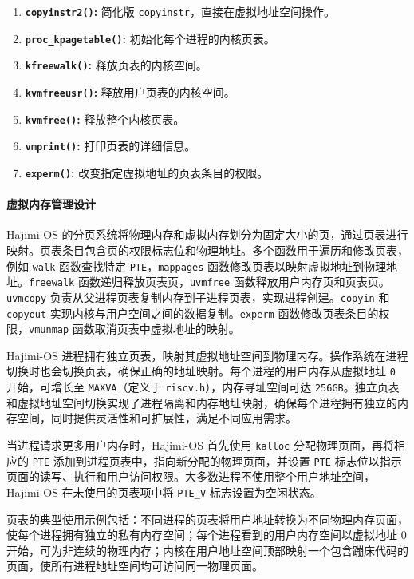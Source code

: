 \documentclass[UTF8]{article}
\begin{document}
\begin{enumerate}[label=\textbf{\arabic*}., wide, labelwidth=!, labelindent=0pt]
  \item \textbf{\texttt{copyinstr2()}:} 简化版 \texttt{copyinstr}，直接在虚拟地址空间操作。
  \item \textbf{\texttt{proc\_kpagetable()}:} 初始化每个进程的内核页表。
  \item \textbf{\texttt{kfreewalk()}:} 释放页表的内核空间。
  \item \textbf{\texttt{kvmfreeusr()}:} 释放用户页表的内核空间。
  \item \textbf{\texttt{kvmfree()}:} 释放整个内核页表。
  \item \textbf{\texttt{vmprint()}:} 打印页表的详细信息。
  \item \textbf{\texttt{experm()}:} 改变指定虚拟地址的页表条目的权限。
\end{enumerate}

\paragraph{虚拟内存管理设计\\}
Hajimi-OS 的分页系统将物理内存和虚拟内存划分为固定大小的页，通过页表进行映射。页表条目包含页的权限标志位和物理地址。多个函数用于遍历和修改页表，例如 \texttt{walk} 函数查找特定 \texttt{PTE}，\texttt{mappages} 函数修改页表以映射虚拟地址到物理地址。\texttt{freewalk} 函数递归释放页表页，\texttt{uvmfree} 函数释放用户内存页和页表页。\texttt{uvmcopy} 负责从父进程页表复制内存到子进程页表，实现进程创建。\texttt{copyin} 和 \texttt{copyout} 实现内核与用户空间之间的数据复制。\texttt{experm} 函数修改页表条目的权限，\texttt{vmunmap} 函数取消页表中虚拟地址的映射。

Hajimi-OS 进程拥有独立页表，映射其虚拟地址空间到物理内存。操作系统在进程切换时也会切换页表，确保正确的地址映射。每个进程的用户内存从虚拟地址 \texttt{0} 开始，可增长至 \texttt{MAXVA}（定义于 \texttt{riscv.h}），内存寻址空间可达 \texttt{256GB}。独立页表和虚拟地址空间切换实现了进程隔离和内存地址映射，确保每个进程拥有独立的内存空间，同时提供灵活性和可扩展性，满足不同应用需求。

当进程请求更多用户内存时，Hajimi-OS 首先使用 \texttt{kalloc} 分配物理页面，再将相应的 \texttt{PTE} 添加到进程页表中，指向新分配的物理页面，并设置 \texttt{PTE} 标志位以指示页面的读写、执行和用户访问权限。大多数进程不使用整个用户地址空间，Hajimi-OS 在未使用的页表项中将 \texttt{PTE\_V} 标志设置为空闲状态。

页表的典型使用示例包括：不同进程的页表将用户地址转换为不同物理内存页面，使每个进程拥有独立的私有内存空间；每个进程看到的用户内存空间以虚拟地址 0 开始，可为非连续的物理内存；内核在用户地址空间顶部映射一个包含蹦床代码的页面，使所有进程地址空间均可访问同一物理页面。
\end{document}
